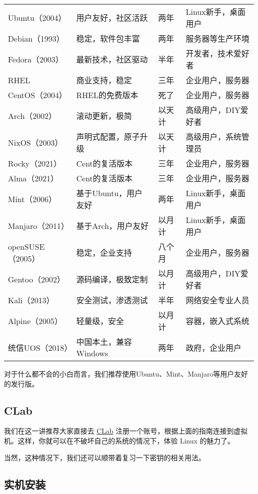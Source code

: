 \documentclass[../main.tex]{subfiles}
\begin{document}
\begin{small}
\begin{longtable}[c]{l|lll}
    Ubuntu（2004） & 用户友好，社区活跃 & 两年 & Linux新手，桌面用户 \\
    Debian（1993） & 稳定，软件包丰富 & 两年 & 服务器等生产环境 \\
    Fedora（2003） & 最新技术，社区驱动 & 半年 & 开发者，技术爱好者 \\
    RHEL & 商业支持，稳定 & 三年 & 企业用户，服务器 \\
    CentOS（2004） & RHEL的免费版本 & 死了 & 企业用户，服务器 \\
    Arch（2002）& 滚动更新，极简 & 以天计 & 高级用户，DIY爱好者 \\
    NixOS（2003） & 声明式配置，原子升级 & 以天计 & 高级用户，系统管理员 \\
    Rocky（2021） & Cent的复活版本 & 三年 & 企业用户，服务器 \\
    Alma（2021） & Cent的复活版本 & 三年 & 企业用户，服务器 \\
    Mint（2006） & 基于Ubuntu，用户友好 & 两年 & Linux新手，桌面用户 \\
    Manjaro（2011） & 基于Arch，用户友好 & 以月计 & Linux新手，桌面用户 \\
    openSUSE（2005） & 稳定，企业支持 & 八个月 & 企业用户，服务器 \\
    Gentoo（2002） & 源码编译，极致定制 & 以月计 & 高级用户，DIY爱好者 \\
    Kali（2013） & 安全测试，渗透测试 & 半年 & 网络安全专业人员 \\
    Alpine（2005） & 轻量级，安全 & 以月计 & 容器，嵌入式系统 \\
    统信UOS（2018） & 中国本土，兼容Windows & 两年 & 政府，企业用户 \\
  \end{longtable}
\end{small}

对于什么都不会的小白而言，我们推荐使用Ubuntu、Mint、Manjaro等用户友好的发行版。

\subsection{CLab}

我们在这一讲推荐大家直接去 \href{https://clab.pku.edu.cn/}{CLab} 注册一个账号，根据上面的指南连接到虚拟机。这样，你就可以在不破坏自己的系统的情况下，体验 Linux 的魅力了。

当然，这种情况下，我们还可以顺带着复习一下密钥的相关用法。

\subsection{实机安装}
\end{document}
